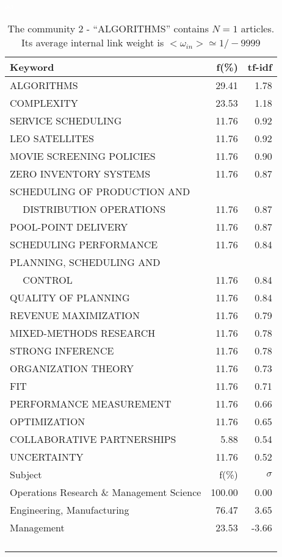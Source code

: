 \documentclass[a4paper,11pt]{report}
\begin{document}
\begin{landscape}
\begin{table}[!ht]
\caption{The community 2 - ``ALGORITHMS'' contains $N = 1$ articles. Its average internal link weight is $<\omega_{in}> \simeq 1/-9999$ }
\textcolor{white}{aa}\\
{\scriptsize\begin{tabular}{|l r  r|}
\hline
Keyword & f(\%) & tf-idf \\
\hline
ALGORITHMS & 29.41 & 1.78\\
COMPLEXITY & 23.53 & 1.18\\
SERVICE SCHEDULING & 11.76 & 0.92\\
LEO SATELLITES & 11.76 & 0.92\\
MOVIE SCREENING POLICIES & 11.76 & 0.90\\
ZERO INVENTORY SYSTEMS & 11.76 & 0.87\\
SCHEDULING OF PRODUCTION AND &  &\\
$\quad$ DISTRIBUTION OPERATIONS & 11.76 & 0.87\\
POOL-POINT DELIVERY & 11.76 & 0.87\\
SCHEDULING PERFORMANCE & 11.76 & 0.84\\
PLANNING, SCHEDULING AND &  &\\
$\quad$ CONTROL & 11.76 & 0.84\\
QUALITY OF PLANNING & 11.76 & 0.84\\
REVENUE MAXIMIZATION & 11.76 & 0.79\\
MIXED-METHODS RESEARCH & 11.76 & 0.78\\
STRONG INFERENCE & 11.76 & 0.78\\
ORGANIZATION THEORY & 11.76 & 0.73\\
FIT & 11.76 & 0.71\\
PERFORMANCE MEASUREMENT & 11.76 & 0.66\\
OPTIMIZATION & 11.76 & 0.65\\
COLLABORATIVE PARTNERSHIPS & 5.88 & 0.54\\
UNCERTAINTY & 11.76 & 0.52\\
\hline
\hline
Subject & f(\%) & $\sigma$\\
\hline
Operations Research \& Management Science & 100.00 & 0.00\\
Engineering, Manufacturing & 76.47 & 3.65\\
Management & 23.53 & -3.66\\
 &  & \\
 &  & \\
 &  & \\
 &  & \\

\end{tabular}}
\end{table}
\end{landscape}
\end{document}
